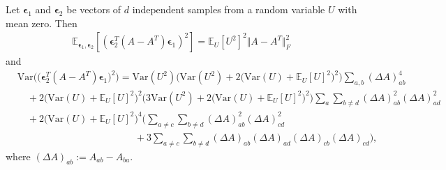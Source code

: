 \documentclass{article}
\theoremstyle{definition}
\theoremstyle{remark}
\begin{document}
	\begingroup
	\renewcommand\theproposition{4}
	\begin{proposition}
		Let $\bm{\epsilon}_{1}$ and $\bm{\epsilon}_{2}$ be vectors of $d$ independent samples from a random variable $U$ with mean zero. Then
		\begin{align*}
		\mathbb{E}_{\bm{\epsilon}_{1},\bm{\epsilon}_{2}}[(\bm{\epsilon}_{2}^{T}(A-A^{T})\bm{\epsilon}_{1})^{2}]=\mathbb{E}_{U}[U^{2}]^{2}\Vert A-A^{T}\Vert_{F}^{2}
		\end{align*}
		and
		\begin{align*}
		&\text{Var}\Big(\big(\bm{\epsilon}_{2}^{T}(A-A^{T})\bm{\epsilon}_{1}\big)^{2}\Big)=\text{Var}(U^{2})\Big(\text{Var}(U^{2})+2\big(\text{Var}(U)+\mathbb{E}_{U}[U]^{2}\big)^{2}\Big)\sum_{a,b}(\Delta A)_{ab}^{4}\\
		&\quad+2\big(\text{Var}(U)+\mathbb{E}_{U}[U]^{2}\big)^{2}\Big(3\text{Var}(U^{2})+2\big(\text{Var}(U)+\mathbb{E}_{U}[U]^{2}\big)^{2}\Big)\sum_{a}\sum_{b\ne d}(\Delta A)_{ab}^{2}(\Delta A)_{ad}^{2}\\
		&\quad+2\big(\text{Var}(U)+\mathbb{E}_{U}[U]^{2}\big)^{4}\Big(\sum_{a\neq c}\sum_{b\neq d}(\Delta A)_{ab}^{2}(\Delta A)_{cd}^{2}\\
		&\quad\quad\quad\quad\quad\quad\quad\quad\quad\quad\quad\quad+3\sum_{a\ne c}\sum_{b\ne d}(\Delta A)_{ab}(\Delta A)_{ad}(\Delta A)_{cb}(\Delta A)_{cd}\Big),
		\end{align*}
		where $(\Delta A)_{ab}:=A_{ab}-A_{ba}$.
	\end{proposition}
	\endgroup
\end{document}
